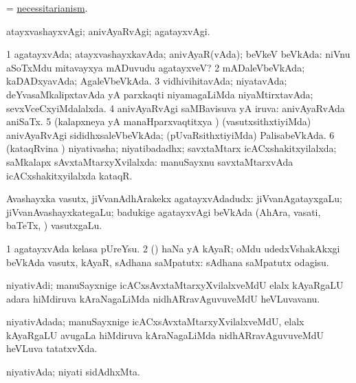 \bentry
{}
\gl{\nA}
\bmng
= \hyperlink{necessitarianism}{necessitarianism}. 
\emng
\eentry

\bentry
{}
\gl{\kirxvi}
\bmng
atayxvashayxvAgi; anivAyaRvAgi; agatayxvAgi. 
\emng
\eentry

\bentry
{}
\gl{\gu}
\bmng
\bnum
\num{1} agatayxvAda; atayxvashayxkavAda; anivAyaR(vAda); beVkeV beVkAda:  niVnu aSoTxMdu mitavayxya mADuvudu agatayxveV? 
\num{2} mADaleVbeVkAda; kaDADxyavAda; AgaleVbeVkAda. 
\num{3} vidhivihitavAda; niyatavAda; deYvasaMkalipxtavAda yA parxkaqti niyamagaLiMda niyaMtirxtavAda; sevxVceCxyiMdalalxda. 
\num{4} anivAyaRvAgi saMBavisuva yA iruva:  anivAyaRvAda aniSaTx. 
\num{5} (kalapxneya yA manaHparxvaqtitxya \vi) (vasutxsithxtiyiMda) anivAyaRvAgi sididhxsaleVbeVkAda; (pUvaRsithxtiyiMda) PalisabeVkAda. 
\num{6} (kataqRvina \vi) niyativasha; niyatibadadhx; savxtaMtarx icACxshakitxyilalxda; saMkalapx sAvxtaMtarxyXvilalxda:  manuSayxnu savxtaMtarxvAda icACxshakitxyilalxda kataqR. 
\enum
\emng
\eentry

\bentry
{}
\gl{\nA}
\bmng
Avashayxka vasutx, jiVvanAdhArakekx agatayxvAdadudx:  jiVvanAgatayxgaLu; jiVvanAvashayxkategaLu; badukige agatayxvAgi beVkAda (AhAra, vasati, baTeTx, \mo) vasutxgaLu. 
\emng

\noindent
\gl{\pagu}
\bmng
\bnum
\num{1}  agatayxvAda kelasa pUreYsu. 
\num{2}  (\AmA) haNa yA kAyaR; oMdu udedxVshakAkxgi beVkAda vasutx, kAyaR, sAdhana saMpatutx:  sAdhana saMpatutx odagisu. 
\enum
\emng
\eentry

\bentry
{}
\gl{\nA}
\bmng
niyativAdi; manuSayxnige icACxsAvxtaMtarxyXvilalxveMdU elalx kAyaRgaLU adara hiMdiruva kAraNagaLiMda nidhARravAguvuveMdU heVLuvavanu. 
\emng
\eentry

\bentry
{}
\gl{\gu}
\bmng
niyativAdada; manuSayxnige icACxsAvxtaMtarxyXvilalxveMdU, elalx kAyaRgaLU avugaLa hiMdiruva kAraNagaLiMda nidhARravAguvuveMdU heVLuva tatatxvXda. 
\emng
\eentry

\bentry
{}
\gl{\nA}
\bmng
niyativAda; niyati sidAdhxMta. 
\emng
\eentry

